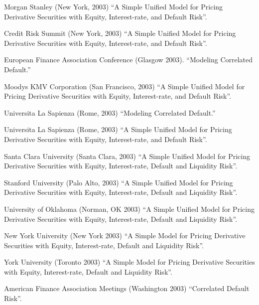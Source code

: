 \documentclass{article}
\begin{document}
\begin{etaremune}
{\item Morgan Stanley (New York, 2003)
``A Simple Unified Model for Pricing Derivative Securities with
Equity, Interest-rate, and Default Risk''.


\item Credit Risk Summit (New York, 2003)
``A Simple Unified Model for Pricing Derivative Securities with
Equity, Interest-rate, and Default Risk''.


\item European Finance Association Conference (Glasgow 2003).
``Modeling Correlated Default.''

\item Moodys KMV Corporation (San Francisco, 2003)
``A Simple Unified Model for Pricing Derivative Securities with
Equity, Interest-rate, and Default Risk''.

\item Universita La Sapienza (Rome, 2003)
``Modeling Correlated Default.''

\item Universita La Sapienza (Rome, 2003)
``A Simple Unified Model for Pricing Derivative Securities with
Equity, Interest-rate, and Default Risk''.

\item Santa Clara University (Santa Clara, 2003)
``A Simple Unified Model for Pricing Derivative Securities with
Equity, Interest-rate, Default and Liquidity Risk''.

\item Stanford University (Palo Alto, 2003)
``A Simple Unified Model for Pricing Derivative Securities with
Equity, Interest-rate, Default and Liquidity Risk''.

\item University of Oklahoma (Norman, OK 2003)
``A Simple Unified Model for Pricing Derivative Securities with
Equity, Interest-rate, Default and Liquidity Risk''.

\item New York University (New York 2003)
``A Simple Model for Pricing Derivative Securities with
Equity, Interest-rate, Default and Liquidity Risk''.

\item York University (Toronto 2003)
``A Simple Model for Pricing Derivative Securities with
Equity, Interest-rate, Default and Liquidity Risk''.


\item American Finance Association Meetings (Washington 2003)
``Correlated Default Risk''.


}
\end{etaremune}
\end{document}
